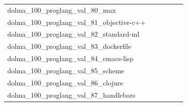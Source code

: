 \documentclass[dvipsnames]{article}
\begin{document}
\begin{appendix}
{\begin{longtable}{m{6cm}m{1.7cm}m{1.7cm}m{1.7cm}m{1.7cm}m{1.7cm}}
	dolma\_100\_proglang\_val\_80\_max  & \colorbox[HTML]{77c578}{\makebox[\mywidth][c]{1.59}} & \colorbox[HTML]{d9f0a3}{\makebox[\mywidth][c]{1.62}} & \colorbox[HTML]{ffffe5}{\makebox[\mywidth][c]{1.80}} & \colorbox[HTML]{cdeb9d}{\makebox[\mywidth][c]{1.61}} & \colorbox[HTML]{b8e293}{\makebox[\mywidth][c]{1.61}}\\
	dolma\_100\_proglang\_val\_81\_objective-c++  & \colorbox[HTML]{bbe395}{\makebox[\mywidth][c]{2.18}} & \colorbox[HTML]{dcf1a5}{\makebox[\mywidth][c]{2.19}} & \colorbox[HTML]{ffffe5}{\makebox[\mywidth][c]{2.40}} & \colorbox[HTML]{bae294}{\makebox[\mywidth][c]{2.17}} & \colorbox[HTML]{77c578}{\makebox[\mywidth][c]{2.16}}\\
	dolma\_100\_proglang\_val\_82\_standard-ml  & \colorbox[HTML]{77c578}{\makebox[\mywidth][c]{3.57}} & \colorbox[HTML]{fcfdd5}{\makebox[\mywidth][c]{4.05}} & \colorbox[HTML]{ffffe5}{\makebox[\mywidth][c]{4.79}} & \colorbox[HTML]{ebf7b0}{\makebox[\mywidth][c]{3.81}} & \colorbox[HTML]{e3f4aa}{\makebox[\mywidth][c]{3.77}}\\
	dolma\_100\_proglang\_val\_83\_dockerfile  & \colorbox[HTML]{eaf7af}{\makebox[\mywidth][c]{4.08}} & \colorbox[HTML]{fdfedb}{\makebox[\mywidth][c]{4.17}} & \colorbox[HTML]{ffffe5}{\makebox[\mywidth][c]{4.37}} & \colorbox[HTML]{77c578}{\makebox[\mywidth][c]{4.01}} & \colorbox[HTML]{d1ec9f}{\makebox[\mywidth][c]{4.05}}\\
	dolma\_100\_proglang\_val\_84\_emacs-lisp  & \colorbox[HTML]{def2a6}{\makebox[\mywidth][c]{3.83}} & \colorbox[HTML]{ddf1a6}{\makebox[\mywidth][c]{3.83}} & \colorbox[HTML]{ffffe5}{\makebox[\mywidth][c]{4.44}} & \colorbox[HTML]{d0ec9e}{\makebox[\mywidth][c]{3.80}} & \colorbox[HTML]{77c578}{\makebox[\mywidth][c]{3.72}}\\
	dolma\_100\_proglang\_val\_85\_scheme  & \colorbox[HTML]{84cb7d}{\makebox[\mywidth][c]{2.78}} & \colorbox[HTML]{e0f2a8}{\makebox[\mywidth][c]{2.86}} & \colorbox[HTML]{ffffe5}{\makebox[\mywidth][c]{3.40}} & \colorbox[HTML]{cdeb9d}{\makebox[\mywidth][c]{2.84}} & \colorbox[HTML]{77c578}{\makebox[\mywidth][c]{2.77}}\\
	dolma\_100\_proglang\_val\_86\_clojure  & \colorbox[HTML]{7dc87b}{\makebox[\mywidth][c]{3.18}} & \colorbox[HTML]{dff2a7}{\makebox[\mywidth][c]{3.30}} & \colorbox[HTML]{ffffe5}{\makebox[\mywidth][c]{4.00}} & \colorbox[HTML]{cdeb9d}{\makebox[\mywidth][c]{3.26}} & \colorbox[HTML]{77c578}{\makebox[\mywidth][c]{3.17}}\\
	dolma\_100\_proglang\_val\_87\_handlebars  & \colorbox[HTML]{def2a6}{\makebox[\mywidth][c]{1.79}} & \colorbox[HTML]{c8e89a}{\makebox[\mywidth][c]{1.79}} & \colorbox[HTML]{ffffe5}{\makebox[\mywidth][c]{1.88}} & \colorbox[HTML]{addd8e}{\makebox[\mywidth][c]{1.78}} & \colorbox[HTML]{77c578}{\makebox[\mywidth][c]{1.78}}\\

\end{longtable}}
\end{appendix}
\end{document}
